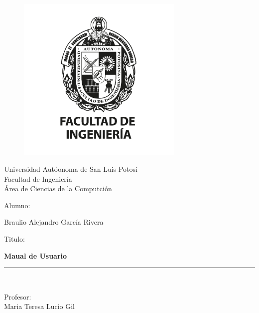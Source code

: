 \documentclass[titlepage]{report}
\begin{document}
\begin{titlepage}

\begin{center}
\vspace*{-1in}
\begin{figure}[htb]
\begin{center}
\includegraphics[width=8cm]{4344.png} 
\end{center}
\end{figure}

Universidad Aut\'{o}onoma de San Luis Potos\'{i}\\
\vspace*{0.15in}
Facultad de Ingenier\'{i}a\\
\vspace*{0.15in}
\'{A}rea de Ciencias de la Computci\'{o}n\\
\vspace*{0.6in}
\begin{Large}
 Alumno:\\
\end{Large}
\vspace*{0.15in}
Braulio Alejandro Garc\'{i}a Rivera\\
\vspace*{0.6in}
\begin{large}
Titulo:\\
\end{large}
\vspace*{0.2in}
\begin{Large}
\textbf{Maual de Usuario} \\
\end{Large}
\vspace*{0.3in}
\rule{80mm}{0.1mm}\\
\vspace*{0.1in}
\begin{large}
Profesor: \\
Maria Teresa Lucio Gil \\
\end{large}
\end{center}
\end{titlepage}
\end{document}
